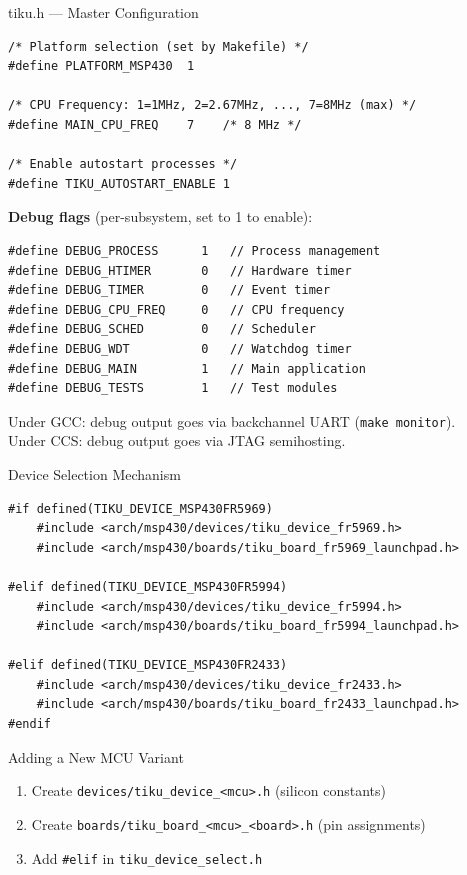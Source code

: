 \documentclass[aspectratio=169, 10pt]{beamer}
\begin{document}
\begin{frame}[fragile]{tiku.h — Master Configuration}
\begin{lstlisting}[style=cstyle]
/* Platform selection (set by Makefile) */
#define PLATFORM_MSP430  1

/* CPU Frequency: 1=1MHz, 2=2.67MHz, ..., 7=8MHz (max) */
#define MAIN_CPU_FREQ    7    /* 8 MHz */

/* Enable autostart processes */
#define TIKU_AUTOSTART_ENABLE 1
\end{lstlisting}

\vspace{0.3em}
\textbf{Debug flags} (per-subsystem, set to 1 to enable):
\begin{lstlisting}[style=cstyle]
#define DEBUG_PROCESS      1   // Process management
#define DEBUG_HTIMER       0   // Hardware timer
#define DEBUG_TIMER        0   // Event timer
#define DEBUG_CPU_FREQ     0   // CPU frequency
#define DEBUG_SCHED        0   // Scheduler
#define DEBUG_WDT          0   // Watchdog timer
#define DEBUG_MAIN         1   // Main application
#define DEBUG_TESTS        1   // Test modules
\end{lstlisting}

Under GCC: debug output goes via backchannel UART (\texttt{make monitor}).\\
Under CCS: debug output goes via JTAG semihosting.
\end{frame}

\begin{frame}[fragile]{Device Selection Mechanism}
\begin{lstlisting}[style=cstyle, title={arch/msp430/tiku\_device\_select.h}]
#if defined(TIKU_DEVICE_MSP430FR5969)
    #include <arch/msp430/devices/tiku_device_fr5969.h>
    #include <arch/msp430/boards/tiku_board_fr5969_launchpad.h>

#elif defined(TIKU_DEVICE_MSP430FR5994)
    #include <arch/msp430/devices/tiku_device_fr5994.h>
    #include <arch/msp430/boards/tiku_board_fr5994_launchpad.h>

#elif defined(TIKU_DEVICE_MSP430FR2433)
    #include <arch/msp430/devices/tiku_device_fr2433.h>
    #include <arch/msp430/boards/tiku_board_fr2433_launchpad.h>
#endif
\end{lstlisting}

\vspace{0.3em}
\begin{block}{Adding a New MCU Variant}
\begin{enumerate}
  \item Create \texttt{devices/tiku\_device\_<mcu>.h} (silicon constants)
  \item Create \texttt{boards/tiku\_board\_<mcu>\_<board>.h} (pin assignments)
  \item Add \texttt{\#elif} in \texttt{tiku\_device\_select.h}
\end{enumerate}
\end{block}
\end{frame}
\end{document}
